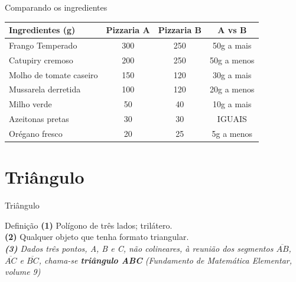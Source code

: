 \documentclass[12pt]{beamer}
\begin{document}
    \begin{frame}{Comparando os ingredientes}
    
        \begin{table}[h]
        \centering
        \small
        \renewcommand{\arraystretch}{1.3}
            \begin{tabular}{lccc}
                \hline
                \textbf{Ingredientes (g)} & \textbf{Pizzaria A} & \textbf{Pizzaria B} & \textbf{A vs B} \\
                \hline
                Frango Temperado & 300 & 250 & 50g a mais \\
                Catupiry cremoso & 200 & 250 & 50g a menos \\
                Molho de tomate caseiro & 150 & 120 & 30g a mais \\
                Mussarela derretida & 100 & 120 & 20g a menos \\
                Milho verde & 50 & 40 & 10g a mais \\
                Azeitonas pretas & 30 & 30 & IGUAIS \\
                Orégano fresco & 20 & 25 & 5g a menos \\
                \hline
            \end{tabular}
        \end{table}

    \end{frame}
    
\section{Triângulo}

    \begin{frame}{Triângulo}
        \begin{alertblock}{Definição}
        \justifying
            \textbf{(1)} Polígono de três lados; trilátero.\\
            \textbf{(2)} Qualquer objeto que tenha formato triangular.\\
            \textit{\textbf{(3)} Dados três pontos, A, B e C, não colineares, à reunião dos segmentos $\overline{AB}$, $\overline{AC}$ e $\overline{BC}$, chama-se \textbf{triângulo ABC} (Fundamento de Matemática Elementar, volume 9)}\\
        \end{alertblock}
    \end{frame}
\end{document}
